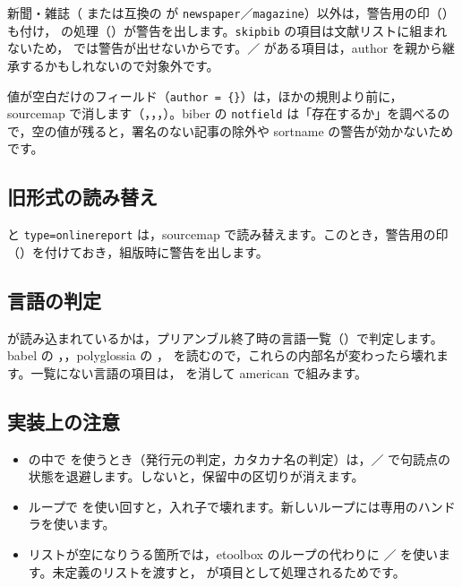 新聞・雑誌（ または互換の  が \texttt{newspaper}／\texttt{magazine}）以外は，警告用の印（）も付け， の処理（）が警告を出します。\texttt{skipbib} の項目は文献リストに組まれないため， では警告が出せないからです。／ がある項目は，author を親から継承するかもしれないので対象外です。

値が空白だけのフィールド（\texttt{author = \{\}}）は，ほかの規則より前に，sourcemap で消します（，，，）。biber の \texttt{notfield} は「存在するか」を調べるので，空の値が残ると，署名のない記事の除外や sortname の警告が効かないためです。

\subsection{旧形式の読み替え}
 と \texttt{type=onlinereport} は，sourcemap で読み替えます。このとき，警告用の印（）を付けておき，組版時に警告を出します。

\subsection{言語の判定}
 が読み込まれているかは，プリアンブル終了時の言語一覧（）で判定します。babel の ，，polyglossia の ， を読むので，これらの内部名が変わったら壊れます。一覧にない言語の項目は， を消して american で組みます。

\subsection{実装上の注意}
\begin{itemize}
\item {} の中で  を使うとき（発行元の判定，カタカナ名の判定）は，／ で句読点の状態を退避します。しないと，保留中の区切りが消えます。
\item ループで  を使い回すと，入れ子で壊れます。新しいループには専用のハンドラを使います。
\item リストが空になりうる箇所では，etoolbox のループの代わりに ／ を使います。未定義のリストを渡すと， が項目として処理されるためです。
\end{itemize}
